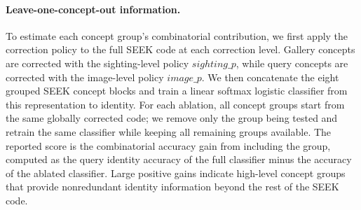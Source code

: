 \paragraph{Leave-one-concept-out information.}
To estimate each concept group's combinatorial contribution, we first apply the correction policy to the full SEEK code at each correction level. Gallery concepts are corrected with the sighting-level policy \(sighting\_p\), while query concepts are corrected with the image-level policy \(image\_p\). We then concatenate the eight grouped SEEK concept blocks and train a linear softmax logistic classifier from this representation to identity. For each ablation, all concept groups start from the same globally corrected code; we remove only the group being tested and retrain the same classifier while keeping all remaining groups available. The reported score is the combinatorial accuracy gain from including the group, computed as the query identity accuracy of the full classifier minus the accuracy of the ablated classifier. Large positive gains indicate high-level concept groups that provide nonredundant identity information beyond the rest of the SEEK code.
